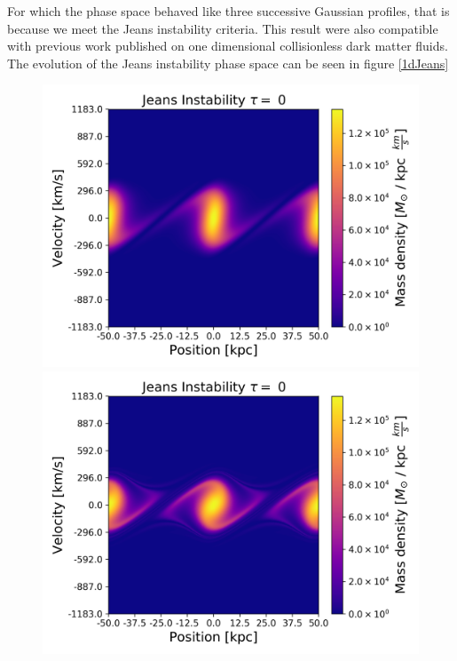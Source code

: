For which the phase space behaved like three successive Gaussian profiles, that is because we meet the Jeans instability criteria. This result were also compatible with previous work published on one dimensional collisionless dark matter fluids. The evolution of the Jeans instability phase space can be seen in figure \ref{1dJeans}


\begin{figure}[h!]
    \centering
    \includegraphics[scale=0.45]{imag/jeans7.png}
    \includegraphics[scale=0.45]{imag/jeans22.png}

\end{figure}
